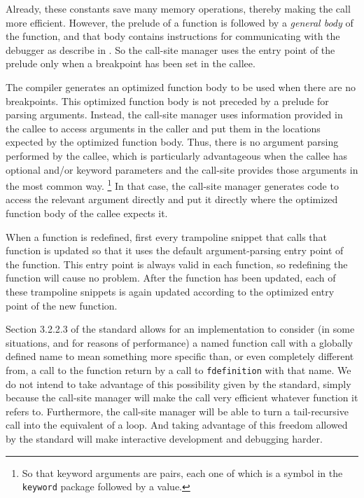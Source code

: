 Already, these constants save many memory operations, thereby making
the call more efficient.  However, the prelude of a function is
followed by a \emph{general body} of the function, and that body
contains instructions for communicating with the debugger as describe
in .  So the call-site manager uses the entry
point of the prelude only when a breakpoint has been set in the
callee.

The compiler generates an optimized function body to be used when
there are no breakpoints.  This optimized function body is not
preceded by a prelude for parsing arguments.  Instead, the call-site
manager uses information provided in the callee to access arguments in
the caller and put them in the locations expected by the optimized
function body.  Thus, there is no argument parsing performed by the
callee, which is particularly advantageous when the callee has
optional and/or keyword parameters and the call-site provides those
arguments in the most common way.%
\footnote{So that keyword arguments are pairs, each one of which is a
  symbol in the \texttt{keyword} package followed by a value.}
In that case, the call-site manager generates code to access the
relevant argument directly and put it directly where the optimized
function body of the callee expects it.

When a function is redefined, first every trampoline snippet that calls
that function is updated so that it uses the default argument-parsing
entry point of the function.  This entry point is always valid in each
function, so redefining the function will cause no problem.  After the
function has been updated, each of these trampoline snippets is again
updated according to the optimized entry point of the new function.

Section 3.2.2.3 of the \commonlisp{} standard allows for an
implementation to consider (in some situations, and for reasons of
performance) a named function call with a globally defined name to
mean something more specific than, or even completely different from,
a call to the function return by a call to \texttt{fdefinition} with
that name.  We do not intend to take advantage of this possibility
given by the standard, simply because the call-site manager will make
the call very efficient whatever function it refers to.  Furthermore,
the call-site manager will be able to turn a tail-recursive call into
the equivalent of a loop.  And taking advantage of this freedom
allowed by the standard will make interactive development and
debugging harder.

